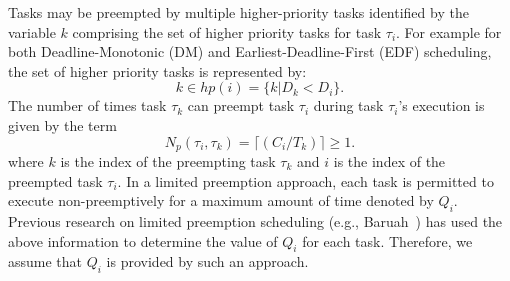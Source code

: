 Tasks may be preempted by multiple higher-priority tasks identified by the variable $k$ comprising the set of higher priority tasks for task \begin{math}\tau_{i}\end{math}. For example for both Deadline-Monotonic (DM) and Earliest-Deadline-First (EDF) scheduling, the set of higher priority tasks is represented by:
\begin{equation}\label{eqn:edf-hp-tasks}
    k \in hp(i) = \{k | D_{k} < D_{i}\}.
\end{equation}
\noindent
The number of times task \begin{math}\tau_{k}\end{math} can preempt task \begin{math}\tau_{i}\end{math} during task \begin{math}\tau_{i}\end{math}'s execution is given by the term
\begin{equation}\label{eqn:num-preemptions}
    N_{p}(\tau_{i},\tau_{k})=\lceil(C_{i}/T_{k})\rceil \geq 1.
\end{equation}
\noindent
where $k$ is the index of the preempting task \begin{math}\tau_{k}\end{math} and $i$ is the index of the preempted task \begin{math}\tau_{i}\end{math}.  In a limited preemption approach, each task is permitted to execute non-preemptively for a maximum amount of time denoted by \begin{math}Q_{i}\end{math}.  Previous research on limited preemption scheduling (e.g., Baruah~\cite{baruah:05}) has used the above information to determine the value of $Q_i$ for each task.  Therefore, we assume that $Q_i$ is provided by such an approach.
%

